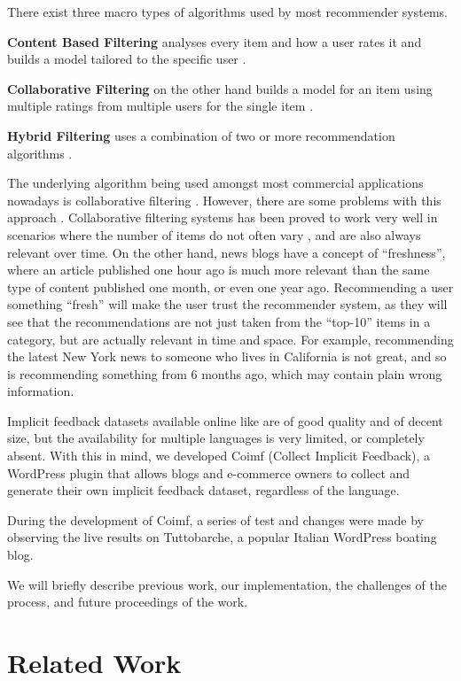 \documentclass[sigconf,nonacm]{acmart}
\begin{document}
There exist three macro types of algorithms used by most recommender
systems.

\textbf{Content Based Filtering} analyses every item and how
a user rates it and builds a model tailored to the specific user \cite{ricci2011}.

\textbf{Collaborative Filtering} on the other hand builds a model for an item
using multiple ratings from multiple users for the single item \cite{ricci2011}.

\textbf{Hybrid Filtering} uses a combination of two or more recommendation
algorithms \cite{burke2002hybrid}.

The underlying algorithm being used amongst most commercial applications nowadays
is collaborative filtering \cite{Koren2011}. However, there are some problems with
this approach \cite{ilievski2013}. Collaborative filtering systems has been
proved to work very well in scenarios where the number of items do not often
vary \cite{huang2007comparison}, and are also always relevant over time. On the
other hand, news blogs have a concept of ``freshness'', where an article
published one hour ago is much more relevant than the same type of content
published one month, or even one year ago. Recommending a user something
``fresh'' will make the user trust the recommender system, as they will see that
the recommendations are not just taken from the ``top-10'' items in a category,
but are actually relevant in time and space. For example, recommending the
latest New York news to someone who lives in California is not great, and so is
recommending something from 6 months ago, which may contain plain wrong information.

Implicit feedback datasets available online like \cite{wumind, gulla2017adressa} are
of good quality and of decent size, but the availability for multiple languages
is very limited, or completely absent. With this in mind, we developed Coimf
(Collect Implicit Feedback), a WordPress plugin that allows blogs and e-commerce
owners to collect and generate their own implicit feedback dataset, regardless
of the language.

During the development of Coimf, a series of test and changes were made by
observing the live results on Tuttobarche, a popular Italian WordPress boating
blog.

We will briefly describe previous work, our implementation, the challenges of the
process, and future proceedings of the work.

\section{Related Work}
\label{sec:related-work}
\end{document}
